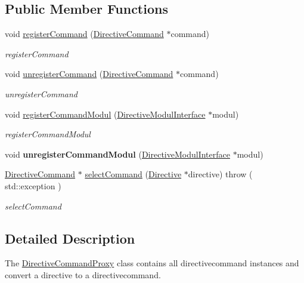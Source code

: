 \subsection*{Public Member Functions}
\begin{DoxyCompactItemize}
\item 
void \hyperlink{classdirective_1_1DirectiveCommandProxy_a17fe1f9de92de665eec9bff4d5bfd76b}{register\+Command} (\hyperlink{classdirective_1_1DirectiveCommand}{Directive\+Command} $\ast$command)
\begin{DoxyCompactList}\small\item\em register\+Command \end{DoxyCompactList}\item 
void \hyperlink{classdirective_1_1DirectiveCommandProxy_aa62a0facb8bd0f4d4ef041b5168078fe}{unregister\+Command} (\hyperlink{classdirective_1_1DirectiveCommand}{Directive\+Command} $\ast$command)
\begin{DoxyCompactList}\small\item\em unregister\+Command \end{DoxyCompactList}\item 
void \hyperlink{classdirective_1_1DirectiveCommandProxy_ac69b1d5c1b4d8081c17028c452a5f2da}{register\+Command\+Modul} (\hyperlink{classdirective_1_1DirectiveModulInterface}{Directive\+Modul\+Interface} $\ast$modul)
\begin{DoxyCompactList}\small\item\em register\+Command\+Modul \end{DoxyCompactList}\item 
\mbox{\label{classdirective_1_1DirectiveCommandProxy_a3a03a2e2f3a06c6f6fdb8b507d076d4f}} 
void {\bfseries unregister\+Command\+Modul} (\hyperlink{classdirective_1_1DirectiveModulInterface}{Directive\+Modul\+Interface} $\ast$modul)
\item 
\hyperlink{classdirective_1_1DirectiveCommand}{Directive\+Command} $\ast$ \hyperlink{classdirective_1_1DirectiveCommandProxy_a6074c404a6680496e0aaf4181de99755}{select\+Command} (\hyperlink{classdirective_1_1Directive}{Directive} $\ast$directive)  throw ( std\+::exception )
\begin{DoxyCompactList}\small\item\em select\+Command \end{DoxyCompactList}\end{DoxyCompactItemize}


\subsection{Detailed Description}
The \hyperlink{classdirective_1_1DirectiveCommandProxy}{Directive\+Command\+Proxy} class contains all directivecommand instances and convert a directive to a directivecommand. 

